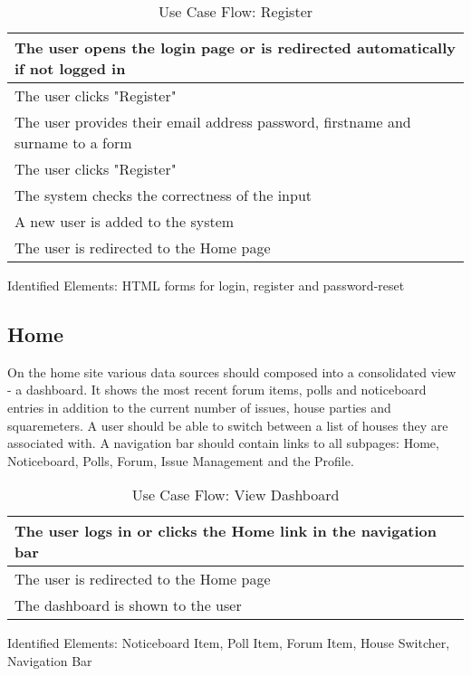 \begin{table}[H]
  \begin{tabularx}{\linewidth}{|X|}
    \hline
     The user opens the login page or is redirected automatically if not logged in \\
     \hline
     The user clicks "Register" \\
     \hline
     The user provides their email address password, firstname and surname to a form \\
     \hline
     The user clicks "Register" \\
     \hline
     The system checks the correctness of the input \\
     \hline
     A new user is added to the system \\
     \hline
     The user is redirected to the Home page \\
     \hline 
  \end{tabularx}
  \caption{Use Case Flow: Register}
\end{table}

Identified Elements: HTML forms for login, register and password-reset

\subsection{Home}
On the home site various data sources should composed into a consolidated view - a dashboard. It shows the most recent forum items, polls and noticeboard entries in addition to the current number of issues, house parties and squaremeters. A user should be able to switch between a list of houses they are associated with. A navigation bar should contain links to all subpages: Home, Noticeboard, Polls, Forum, Issue Management and the Profile. \newline

\begin{table}[H]
  \begin{tabularx}{\linewidth}{|X|}
    \hline
     The user logs in or clicks the Home link in the navigation bar \\
     \hline
     The user is redirected to the Home page \\
     \hline
     The dashboard is shown to the user \\
     \hline
  \end{tabularx}
  \caption{Use Case Flow: View Dashboard}
\end{table}

Identified Elements: Noticeboard Item, Poll Item, Forum Item, House Switcher, Navigation Bar

